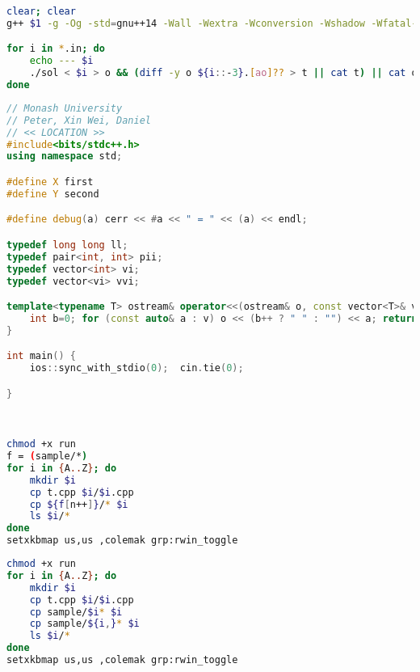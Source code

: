 
\begin{lstlisting}[language=bash,frame=tb,numbers=none,showstringspaces=false,linewidth=0.487\textwidth]
clear; clear
g++ $1 -g -Og -std=gnu++14 -Wall -Wextra -Wconversion -Wshadow -Wfatal-errors -fsanitize=address,undefined -o sol || exit

for i in *.in; do
	echo --- $i
	./sol < $i > o && (diff -y o ${i::-3}.[ao]?? > t || cat t) || cat o
done
\end{lstlisting}

\begin{lstlisting}[language=C++,frame=tb,linewidth=0.487\textwidth]
// Monash University
// Peter, Xin Wei, Daniel
// << LOCATION >>
#include<bits/stdc++.h>
using namespace std;

#define X first
#define Y second

#define debug(a) cerr << #a << " = " << (a) << endl;

typedef long long ll;
typedef pair<int, int> pii;
typedef vector<int> vi;
typedef vector<vi> vvi;

template<typename T> ostream& operator<<(ostream& o, const vector<T>& v) {
	int b=0; for (const auto& a : v) o << (b++ ? " " : "") << a; return o;
}

int main() {
	ios::sync_with_stdio(0);  cin.tie(0);

}
\end{lstlisting}

\ \begin{minipage}{0.49\textwidth}
\begin{lstlisting}[language=bash, showstringspaces=false, keywordstyle=\bfseries\color{theWhite}, backgroundcolor=\color{theBlack}, basicstyle=\bfseries\scriptsize\ttfamily\color{theWhite}, morekeywords={chmod, mkdir, cp},numbers=none,frame=single,linewidth=0.47\textwidth]
chmod +x run
f = (sample/*)
for i in {A..Z}; do
	mkdir $i
	cp t.cpp $i/$i.cpp
	cp ${f[n++]}/* $i
	ls $i/*
done
setxkbmap us,us ,colemak grp:rwin_toggle
\end{lstlisting}
\end{minipage} \quad \begin{minipage}{0.49\textwidth}
\begin{lstlisting}[language=bash, showstringspaces=false, keywordstyle=\bfseries\color{theWhite}, backgroundcolor=\color{theBlack}, basicstyle=\bfseries\scriptsize\ttfamily\color{theWhite}, morekeywords={chmod, mkdir, cp},numbers=none,frame=single,linewidth=0.475\textwidth]
chmod +x run
for i in {A..Z}; do
	mkdir $i
	cp t.cpp $i/$i.cpp
	cp sample/$i* $i
	cp sample/${i,}* $i
	ls $i/*
done
setxkbmap us,us ,colemak grp:rwin_toggle
\end{lstlisting}
\end{minipage}
